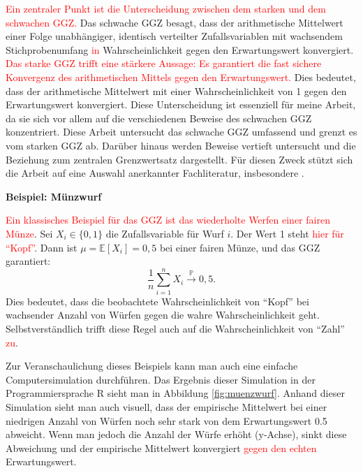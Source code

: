 \documentclass[aodsor,preprint]{imsart}
\numberwithin{equation}{section}
\theoremstyle{plain}
\begin{document}
\textcolor{red}{Ein zentraler Punkt ist die Unterscheidung zwischen dem starken und dem schwachen GGZ.}
Das schwache GGZ besagt, dass der arithmetische Mittelwert einer Folge unabhängiger, identisch verteilter Zufallsvariablen mit wachsendem Stichprobenumfang \textcolor{red}{in} Wahrscheinlichkeit gegen den Erwartungswert konvergiert.
\textcolor{red}{Das starke GGZ trifft eine stärkere Aussage: Es garantiert die fast sichere Konvergenz des arithmetischen Mittels gegen den Erwartungswert.}
Dies bedeutet, dass der arithmetische Mittelwert mit einer Wahrscheinlichkeit von 1 gegen den Erwartungswert konvergiert.
Diese Unterscheidung ist essenziell für meine Arbeit, da sie sich vor allem auf die verschiedenen Beweise des schwachen GGZ konzentriert.
Diese Arbeit untersucht das schwache GGZ umfassend und grenzt es vom starken GGZ ab.
Darüber hinaus werden Beweise vertieft untersucht und die Beziehung zum zentralen Grenzwertsatz dargestellt.
Für diesen Zweck stützt sich die Arbeit auf eine Auswahl anerkannter Fachliteratur, insbesondere \citet{degroot2021, blitzstein2019, stoyanov2013}.

\newpage


\textbf{Beispiel: Münzwurf}

\textcolor{red}{Ein klassisches Beispiel für das GGZ ist das wiederholte Werfen einer fairen Münze}.
Sei \( X_i \in \{0,1\} \) die Zufallsvariable für Wurf \( i \). Der Wert 1 steht \textcolor{red}{hier für \enquote{Kopf}}. Dann ist \( \mu = \mathbb{E}[X_i] = 0{,}5 \) bei einer fairen Münze, und das GGZ garantiert:
\[
\frac{1}{n} \sum_{i=1}^n X_i \xrightarrow{\mathbb{P}} 0{,}5.
\]
Dies bedeutet, dass die beobachtete Wahrscheinlichkeit von \enquote{Kopf} bei wachsender Anzahl von Würfen gegen die wahre Wahrscheinlichkeit geht.
Selbstverständlich trifft diese Regel auch auf die Wahrscheinlichkeit von \enquote{Zahl} \textcolor{red}{zu}. 

Zur Veranschaulichung dieses Beispiels kann man auch eine einfache Computersimulation durchführen.
Das Ergebnis dieser Simulation in der Programmiersprache R sieht man in Abbildung \ref{fig:muenzwurf}.
Anhand dieser Simulation sieht man auch visuell, dass der empirische Mittelwert bei einer niedrigen Anzahl von Würfen noch sehr stark von dem Erwartungswert 0.5 abweicht.
Wenn man jedoch die Anzahl der Würfe erhöht (y-Achse), sinkt diese Abweichung und der empirische Mittelwert konvergiert \textcolor{red}{gegen den echten} Erwartungswert.
\end{document}
